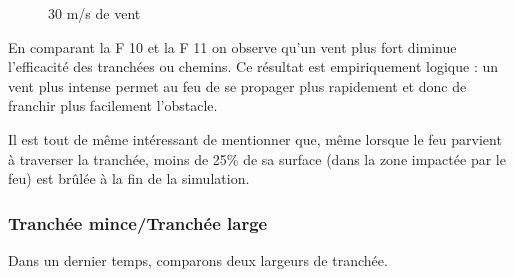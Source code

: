 \documentclass[12pt]{article}
\newcommand{\fig}[1]{
    F\resizebox{!}{1.3ex}{IGURE} #1
}
\begin{document}
\begin{figure}[!ht]
\begin{minipage}{0.35\textwidth}
      \caption{$30$ m/s de vent}\label{Fig:Data8}
    \end{minipage}
\end{figure}

En comparant la\fig{10}et la\fig{11}on observe qu'un vent plus fort diminue l'efficacité des tranchées ou chemins. Ce résultat est empiriquement logique : un vent plus intense permet au feu de se propager plus rapidement et donc de franchir plus facilement l'obstacle.

Il est tout de même intéressant de mentionner que, même lorsque le feu parvient à traverser la tranchée, moins de 25\% de sa surface (dans la zone impactée par le feu) est brûlée à la fin de la simulation.

\subsubsection{Tranchée mince/Tranchée large}

Dans un dernier temps, comparons deux largeurs de tranchée.
\end{document}
